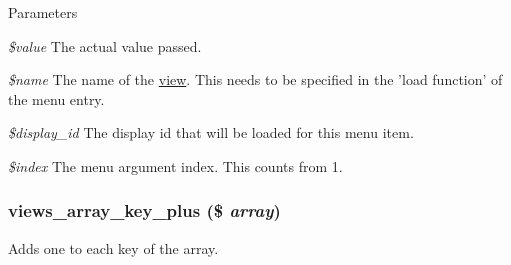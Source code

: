 \begin{DoxyParams}{Parameters}
\item[{\em \$value}]The actual value passed. \item[{\em \$name}]The name of the \hyperlink{classview}{view}. This needs to be specified in the 'load function' of the menu entry. \item[{\em \$display\_\-id}]The display id that will be loaded for this menu item. \item[{\em \$index}]The menu argument index. This counts from 1. \end{DoxyParams}
\hypertarget{views_8module_ab67b484fcc0a053477538cab840645c0}{
\subsubsection[{views\_\-array\_\-key\_\-plus}]{\setlength{\rightskip}{0pt plus 5cm}views\_\-array\_\-key\_\-plus (\$ {\em array})}}
\label{views_8module_ab67b484fcc0a053477538cab840645c0}
Adds one to each key of the array.

